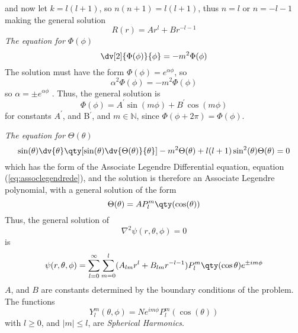     and now let $k = l(l+1)$, so $n(n+1) = l(l+1)$, thus $n=l$ or $n =
    -l-1$ making the general solution
    \begin{equation}
      \label{eq:generalsolr}
      R(r) = A r^l + B r^{-l-1}
    \end{equation}
    {\em The equation for $\Phi(\phi)$}\\
    \[ \dv[2]{\Phi(\phi)}{\phi}= -m^2 \Phi(\phi) \] The solution must
    have the form $\Phi(\phi) = e^{\alpha \phi}$, so
    \[ \alpha^2 \Phi(\phi) = -m^2 \Phi(\phi) \] so $\alpha = \pm
    e^{\alpha \phi}$ . Thus, the general solution is
    \begin{equation}
      \label{eq:generalsolphi}
      \Phi(\phi) = A^{\prime} \sin(m \phi) + B^{\prime} \cos(m \phi)
    \end{equation}
    for constants $A^{\prime}$, and B$^{\prime}$, and $m \in
    \mathbb{N}$, since $\Phi(\phi + 2 \pi) = \Phi(\phi)$.

    {\em The equation for $\Theta(\theta)$}\\
    \[ \sin(\theta) \dv{\theta} \qty[ \sin(\theta)
    \dv{\Theta(\theta)}{\theta}] - m^2 \Theta(\theta) + l(l+1)
    \sin^2(\theta) \Theta(\theta) = 0 \] which has the form of the
    Associate Legendre Differential equation, equation
    (\ref{eq:assoclegendrede}), and the solution is therefore an
    Associate Legendre polynomial, with a general solution of the form
    \[ \Theta(\theta) = A P_l^m \qty( \cos(\theta) ) \] Thus, the
    general solution of
    \[ \nabla^2 \psi(r, \theta, \phi) = 0 \] is
    \begin{equation}
      \label{eq:solutionpdesphere}
      \psi(r, \theta, \phi) = \sum_{l=0}^{\infty} \sum_{m=0}^l (A_{lm}r^l + B_{lm}r^{-l-1}) P_l^m \qty( \cos \theta) e^{\pm i m \phi}
    \end{equation}
    $A$, and $B$ are constants determined by the boundary conditions
    of the problem. The functions
    \begin{equation}
      \label{eq:sphericalharm}
      Y_l^m(\theta, \phi) = N e^{im\phi} P_l^m (\cos(\theta))
    \end{equation}
    with $l \ge 0$, and $|m| \le l$, are {\em Spherical Harmonics}.

